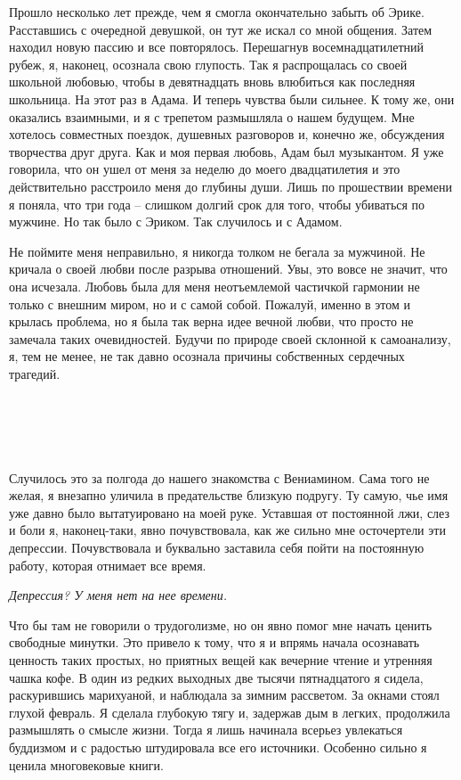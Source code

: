 \documentclass[
]{book}
\begin{document}
Прошло несколько лет прежде, чем я смогла окончательно забыть об Эрике. Расставшись с очередной девушкой, он тут же искал со мной общения. Затем находил новую пассию и все повторялось. Перешагнув восемнадцатилетний рубеж, я, наконец, осознала свою глупость. Так я распрощалась со своей школьной любовью, чтобы в девятнадцать вновь влюбиться как последняя школьница. На этот раз в Адама. И теперь чувства были сильнее. К тому же, они оказались взаимными, и я с трепетом размышляла о нашем будущем. Мне хотелось совместных поездок, душевных разговоров и, конечно же, обсуждения творчества друг друга. Как и моя первая любовь, Адам был музыкантом. Я уже говорила, что он ушел от меня за неделю до моего двадцатилетия и это действительно расстроило меня до глубины души. Лишь по прошествии времени я поняла, что три года -- слишком долгий срок для того, чтобы убиваться по мужчине. Но так было с Эриком. Так случилось и с Адамом.

Не поймите меня неправильно, я никогда толком не бегала за мужчиной. Не кричала о своей любви после разрыва отношений. Увы, это вовсе не значит, что она исчезала. Любовь была для меня неотъемлемой частичкой гармонии не только с внешним миром, но и с самой собой. Пожалуй, именно в этом и крылась проблема, но я была так верна идее вечной любви, что просто не замечала таких очевидностей. Будучи по природе своей склонной к самоанализу, я, тем не менее, не так давно осознала причины собственных сердечных трагедий.

\hypertarget{chapter-22}{%
\chapter{~}\label{chapter-22}}

Случилось это за полгода до нашего знакомства с Вениамином. Сама того не желая, я внезапно уличила в предательстве близкую подругу. Ту самую, чье имя уже давно было вытатуировано на моей руке. Уставшая от постоянной лжи, слез и боли я, наконец-таки, явно почувствовала, как же сильно мне осточертели эти депрессии. Почувствовала и буквально заставила себя пойти на постоянную работу, которая отнимает все время.

\emph{Депрессия? У меня нет на нее времени.}

Что бы там не говорили о трудоголизме, но он явно помог мне начать ценить свободные минутки. Это привело к тому, что я и впрямь начала осознавать ценность таких простых, но приятных вещей как вечерние чтение и утренняя чашка кофе. В один из редких выходных две тысячи пятнадцатого я сидела, раскурившись марихуаной, и наблюдала за зимним рассветом. За окнами стоял глухой февраль. Я сделала глубокую тягу и, задержав дым в легких, продолжила размышлять о смысле жизни. Тогда я лишь начинала всерьез увлекаться буддизмом и с радостью штудировала все его источники. Особенно сильно я ценила многовековые книги.
\end{document}
